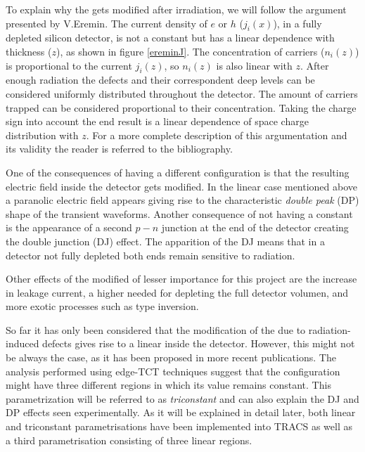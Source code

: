 To explain why the \neff gets modified after irradiation, we will follow the argument presented by V.Eremin\cite{Eremin}. The current density of $e$ or $h$ ($j_i(x)$), in a fully depleted silicon detector, is not a constant but has a linear dependence with thickness ($z$), as shown  in figure \ref{ereminJ}. The concentration of carriers ($n_i(z)$) is proportional to the current $j_i(z)$, so $n_i(z)$ is also linear with $z$. After enough radiation the defects and their correspondent deep levels can be considered uniformly distributed throughout the detector. The amount of carriers trapped can be considered proportional to their concentration. Taking the charge sign into account the end result is a linear dependence of space charge distribution with $z$. For a more complete description of this argumentation and its validity the reader is referred to the bibliography.


One of the consequences of having a different \neff configuration is that the resulting electric field inside the detector gets modified. In the linear case mentioned above a paranolic electric field appears giving rise to the characteristic \emph{double peak} (DP) shape of the transient waveforms. Another consequence of not having a constant \neff is the appearance of a second $p-n$ junction at the end of the detector creating the double junction (DJ) effect. The apparition of the DJ means that in a detector not fully depleted both ends remain sensitive to radiation.

Other effects of the modified \neff of lesser importance for this project are the increase in leakage current, a higher \vias needed for depleting the full detector volumen, and more exotic processes such as type inversion. %


So far it has only been considered that the modification of the \neff due to radiation-induced defects gives rise to a linear \neff inside the detector. However, this might not be always the case, as it has been proposed in more recent publications\cite{KramVertex}. The analysis performed using edge-TCT techniques suggest that the \neff configuration might have three different regions in which its value remains constant. This parametrization will be referred to as \emph{triconstant} and can also explain the DJ and DP effects seen experimentally. As it will be explained in detail later, both linear and triconstant parametrisations have been implemented into TRACS as well as a third parametrisation consisting of three linear regions.  

